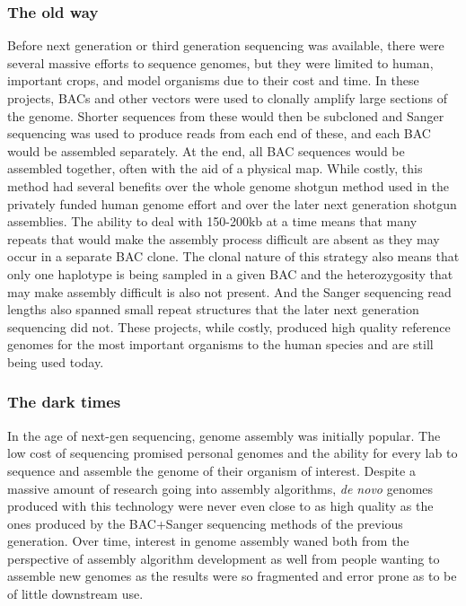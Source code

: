 \subsubsection{The old way}

\par{
Before next generation or third generation sequencing was available, there were several massive efforts to sequence genomes, but they were limited to human, important crops, and model organisms due to their cost and time\cite{genomeproject}\cite{mousegenome}\cite{maizegenome}. In these projects, BACs and other vectors were used to clonally amplify large sections of the genome. Shorter sequences from these would then be subcloned and Sanger sequencing was used to produce reads from each end of these, and each BAC would be assembled separately. At the end, all BAC sequences would be assembled together, often with the aid of a physical map. While costly, this method had several benefits over the whole genome shotgun method used in the privately funded human genome effort and over the later next generation shotgun assemblies. The ability to deal with 150-200kb at a time means that many repeats that would make the assembly process difficult are absent as they may occur in a separate BAC clone. The clonal nature of this strategy also means that only one haplotype is being sampled in a given BAC and the heterozygosity that may make assembly difficult is also not present. And the Sanger sequencing read lengths also spanned small repeat structures that the later next generation sequencing did not. These projects, while costly, produced high quality reference genomes for the most important organisms to the human species and are still being used today.
}

\subsubsection{The dark times}

\par{
In the age of next-gen sequencing, genome assembly was initially popular. The low cost of sequencing promised personal genomes and the ability for every lab to sequence and assemble the genome of their organism of interest. Despite a massive amount of research going into assembly algorithms, \textit{de novo} genomes produced with this technology were never even close to as high quality as the ones produced by the BAC+Sanger sequencing methods of the previous generation\cite{illuminashit}\cite{gage}. Over time, interest in genome assembly waned both from the perspective of assembly algorithm development as well from people wanting to assemble new genomes as the results were so fragmented and error prone as to be of little downstream use\cite{assemblethon}.
}

